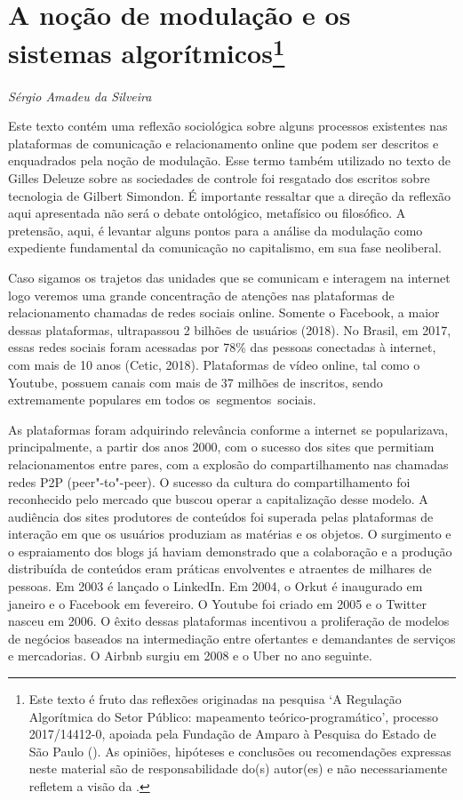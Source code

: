 \chapter{A noção de modulação e os sistemas algorítmicos\footnote{Este texto é fruto das reflexões originadas na pesquisa `A Regulação Algorítmica do Setor Público: mapeamento teórico-programático', processo 2017/14412-0, apoiada pela Fundação de Amparo à Pesquisa do Estado de São Paulo (). As opiniões, hipóteses e conclusões ou recomendações expressas neste material são de responsabilidade do(s) autor(es) e não necessariamente refletem a visão da .}}

\begin{flushright}
\emph{Sérgio Amadeu da Silveira}
\end{flushright}

Este texto contém uma reflexão sociológica sobre alguns processos
existentes nas plataformas de comunicação e relacionamento online que
podem ser descritos e enquadrados pela noção de modulação. Esse termo
também utilizado no texto de Gilles Deleuze sobre as sociedades de
controle foi resgatado dos escritos sobre tecnologia de Gilbert
Simondon. É importante ressaltar que a direção da reflexão aqui
apresentada não será o debate ontológico, metafísico ou filosófico. A
pretensão, aqui, é levantar alguns pontos para a análise da modulação
como expediente fundamental da comunicação no capitalismo, em sua fase
neoliberal.

Caso sigamos os trajetos das unidades que se comunicam e interagem na
internet logo veremos uma grande concentração de atenções nas
plataformas de relacionamento chamadas de redes sociais online. Somente
o Facebook, a maior dessas plataformas, ultrapassou 2 bilhões de
usuários (2018). No Brasil, em 2017, essas redes sociais foram acessadas
por 78\% das pessoas conectadas à internet, com mais de 10 anos (Cetic,
2018). Plataformas de vídeo online, tal como o Youtube, possuem canais
com mais de 37 milhões de inscritos, sendo extremamente populares em
todos os~segmentos~sociais.

As plataformas foram adquirindo relevância conforme a internet se
popularizava, principalmente, a partir dos anos 2000, com o sucesso dos
sites que permitiam relacionamentos entre pares, com a explosão do
compartilhamento nas chamadas redes P2P (peer"-to"-peer). O sucesso da
cultura do compartilhamento foi reconhecido pelo mercado que buscou
operar a capitalização desse modelo. A audiência dos sites produtores de
conteúdos foi superada pelas plataformas de interação em que os usuários
produziam as matérias e os objetos. O surgimento e o espraiamento dos
blogs já haviam demonstrado que a colaboração e a produção distribuída
de conteúdos eram práticas envolventes e atraentes de milhares de
pessoas. Em 2003 é lançado o LinkedIn. Em 2004, o Orkut é inaugurado em
janeiro e o Facebook em fevereiro. O Youtube foi criado em 2005 e o
Twitter nasceu em 2006. O êxito dessas plataformas incentivou a
proliferação de modelos de negócios baseados na intermediação entre
ofertantes e demandantes de serviços e mercadorias. O Airbnb surgiu em
2008 e o Uber no ano seguinte.


